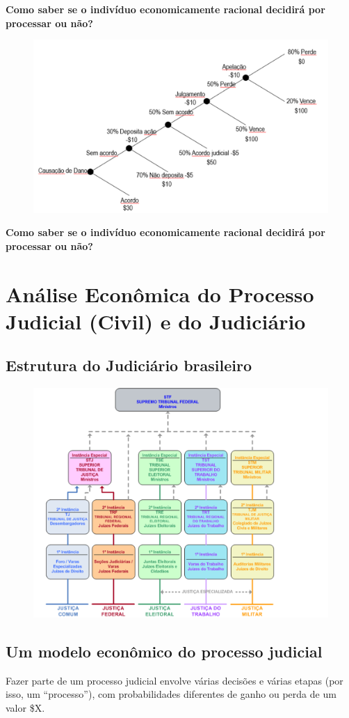\documentclass[a4paper,12pt]{article}[abntex2]
\begin{document}
\textbf{Como saber se o indivíduo economicamente  racional decidirá por processar ou não?}

\begin{figure}[H]
    \centering
    \includegraphics[width=0.7\linewidth]{Imagens/a12i3.png}
\end{figure}

\textbf{Como saber se o indivíduo economicamente  racional decidirá por processar ou não?}

\newpage
\section{\textbf{Análise Econômica do Processo Judicial (Civil) e do Judiciário}}
\subsection{\textbf{Estrutura do Judiciário brasileiro}}
\begin{figure}[H]
    \centering
    \includegraphics[width=0.7\linewidth]{Imagens/a13i1.png}
\end{figure}



\subsection{\textbf{Um modelo econômico do processo judicial}}
Fazer parte de um processo judicial envolve várias decisões e várias etapas (por isso, um “processo”), com probabilidades diferentes de ganho ou perda de um valor \$X.
\end{document}

